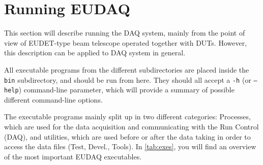 \section{Running EUDAQ}

This section will describe running the DAQ system, mainly from the point of view of EUDET-type beam telescope \cite{telescopesWikiUserManual} operated together with \gls{DUT}s.
However, this description can be applied to DAQ system in general.

All executable programs from the different subdirectories are placed inside the \texttt{bin} subdirectory, and should be run from here. They should all accept a \texttt{-h} (or \texttt{--help}) command-line parameter, which will provide a summary of possible different command-line options.

The executable programs mainly split up in two different categories: Processes, which are used for the data acquisition and communicating with the Run Control (DAQ), and utilities, which are used before or after the data taking in order to access the data files (Test, Devel., Tools).
In \autoref{tab:exes}, you will find an overview of the most important EUDAQ executables.

